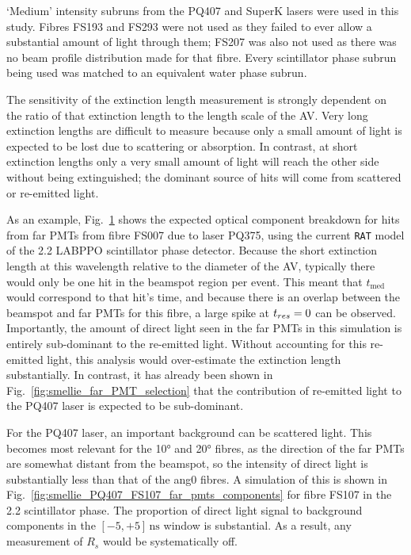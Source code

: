 `Medium' intensity subruns from the PQ407 and SuperK lasers were used in this study. %
Fibres FS193 and FS293 were not used as they failed to ever allow a substantial amount of light through them; FS207 was also not used as there was no beam profile distribution made for that fibre. Every scintillator phase subrun being used was matched to an equivalent water phase subrun.

The sensitivity of the extinction length measurement is strongly dependent on the ratio of that extinction length to the length scale of the AV. Very long extinction lengths are difficult to measure because only a small amount of light is expected to be lost due to scattering or absorption. In contrast, at short extinction lengths only a very small amount of light will reach the other side without being extinguished; the dominant source of hits will come from scattered or re-emitted light.

As an example, Fig.~\ref{fig:smellie_PQ375_far_pmts_components} shows the expected optical component breakdown for hits from far PMTs from fibre FS007 due to laser PQ375, using the current \texttt{RAT} model of the \SI{2.2}{\gpl} LABPPO scintillator phase detector. Because the short extinction length at this wavelength relative to the diameter of the AV, typically there would only be one hit in the beamspot region per event. This meant that $t_{\mathrm{med}}$ would correspond to that hit's time, and because there is an overlap between the beamspot and far PMTs for this fibre, a large spike at $t_{res}{} = 0$ can be observed. Importantly, the amount of direct light seen in the far PMTs in this simulation is entirely sub-dominant to the re-emitted light. Without accounting for this re-emitted light, this analysis would over-estimate the extinction length substantially. In contrast, it has already been shown in Fig.~\ref{fig:smellie_far_PMT_selection} that the contribution of re-emitted light to the PQ407 laser is expected to be sub-dominant.

\begin{figure}
    \centering
    \caption[]{}
    \label{fig:smellie_PQ375_far_pmts_components}
\end{figure}

For the PQ407 laser, an important background can be scattered light. This becomes most relevant for the \ang{10} and \ang{20} fibres, as the direction of the far PMTs are somewhat distant from the beamspot, so the intensity of direct light is substantially less than that of the ang{0} fibres. A simulation of this is shown in Fig.~\ref{fig:smellie_PQ407_FS107_far_pmts_components} for fibre FS107 in the \SI{2.2}{\gpl} scintillator phase. The proportion of direct light signal to background components in the $[-5,+5]\,\si{\ns}$ window is substantial. As a result, any measurement of $R_{s}$ would be systematically off. %

